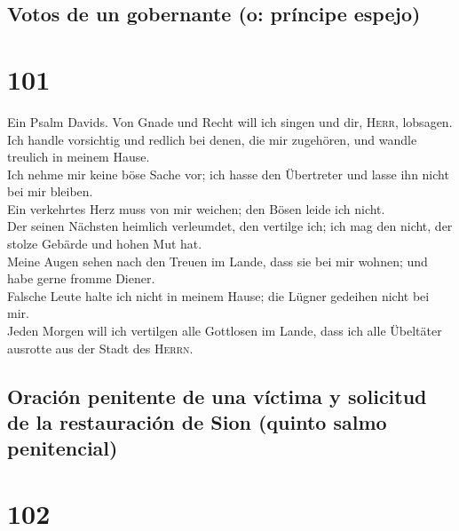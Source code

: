 \hypertarget{votos-de-un-gobernante-o-pruxedncipe-espejo}{%
\subsection{Votos de un gobernante (o: príncipe
espejo)}\label{votos-de-un-gobernante-o-pruxedncipe-espejo}}

\hypertarget{section-100}{%
\section{101}\label{section-100}}

 Ein Psalm Davids. Von Gnade und Recht will ich singen und
dir, \textsc{Herr}, lobsagen.\\
 Ich handle vorsichtig und redlich bei denen, die mir
zugehören, und wandle treulich in meinem Hause.\\
 Ich nehme mir keine böse Sache vor; ich hasse den
Übertreter und lasse ihn nicht bei mir bleiben.\\
 Ein verkehrtes Herz muss von mir weichen; den Bösen leide
ich nicht.\\
 Der seinen Nächsten heimlich verleumdet, den vertilge
ich; ich mag den nicht, der stolze Gebärde und hohen Mut hat.\\
 Meine Augen sehen nach den Treuen im Lande, dass sie bei
mir wohnen; und habe gerne fromme Diener.\\
 Falsche Leute halte ich nicht in meinem Hause; die Lügner
gedeihen nicht bei mir.\\
 Jeden Morgen will ich vertilgen alle Gottlosen im Lande,
dass ich alle Übeltäter ausrotte aus der Stadt des \textsc{Herrn}.

\hypertarget{oraciuxf3n-penitente-de-una-vuxedctima-y-solicitud-de-la-restauraciuxf3n-de-sion-quinto-salmo-penitencial}{%
\subsection{Oración penitente de una víctima y solicitud de la
restauración de Sion (quinto salmo
penitencial)}\label{oraciuxf3n-penitente-de-una-vuxedctima-y-solicitud-de-la-restauraciuxf3n-de-sion-quinto-salmo-penitencial}}

\hypertarget{section-101}{%
\section{102}\label{section-101}}

